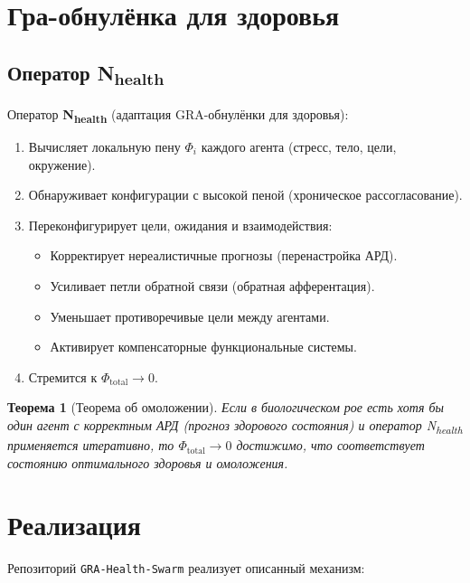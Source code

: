 \documentclass[11pt,a4paper]{article}
\newtheorem{theorem}{Теорема}
\begin{document}
\section{Гра-обнулёнка для здоровья}

\subsection{Оператор N\textsubscript{health}}

Оператор \textbf{N\textsubscript{health}} (адаптация GRA-обнулёнки для здоровья):
\begin{enumerate}
  \item Вычисляет локальную пену $\Phi_i$ каждого агента (стресс, тело, цели, окружение).
  \item Обнаруживает конфигурации с высокой пеной (хроническое рассогласование).
  \item Переконфигурирует цели, ожидания и взаимодействия:
  \begin{itemize}
    \item Корректирует нереалистичные прогнозы (перенастройка АРД).
    \item Усиливает петли обратной связи (обратная афферентация).
    \item Уменьшает противоречивые цели между агентами.
    \item Активирует компенсаторные функциональные системы.
  \end{itemize}
  \item Стремится к $\Phi_{\text{total}} \to 0$.
\end{enumerate}

\begin{theorem}[Теорема об омоложении]
Если в биологическом рое есть хотя бы один агент с корректным АРД (прогноз здорового состояния) и оператор N\textsubscript{health} применяется итеративно, то $\Phi_{\text{total}} \to 0$ достижимо, что соответствует состоянию оптимального здоровья и омоложения.
\end{theorem}

\section{Реализация}

Репозиторий \texttt{GRA-Health-Swarm} реализует описанный механизм:
\end{document}
